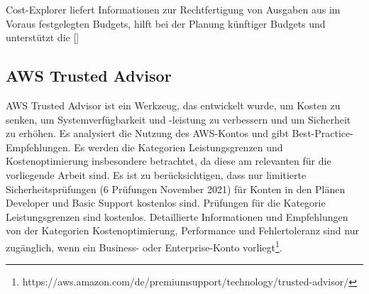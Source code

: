 Cost-Explorer liefert Informationen zur Rechtfertigung von Ausgaben aus im Voraus festgelegten Budgets, hilft bei der Planung künftiger Budgets und unterstützt die []
\subsection{AWS Trusted Advisor}

AWS Trusted Advisor ist ein Werkzeug, das entwickelt wurde, um Kosten zu senken, um Systemverfügbarkeit und -leistung zu verbessern und um Sicherheit zu erhöhen. Es analysiert die Nutzung des AWS-Kontos und gibt Best-Practice-Empfehlungen. Es werden die Kategorien Leistungsgrenzen und Kostenoptimierung insbesondere betrachtet, da diese am relevanten für die vorliegende Arbeit sind. Es ist zu berücksichtigen, dass nur limitierte Sicherheitsprüfungen (6 Prüfungen November 2021) für Konten in den Plänen Developer und Basic Support kostenlos sind. Prüfungen für die Kategorie Leistungsgrenzen sind kostenlos. Detaillierte Informationen und Empfehlungen von der Kategorien Kostenoptimierung, Performance und Fehlertoleranz sind nur zugänglich, wenn ein Business- oder Enterprise-Konto vorliegt\footnote{https://aws.amazon.com/de/premiumsupport/technology/trusted-advisor/}. \\

